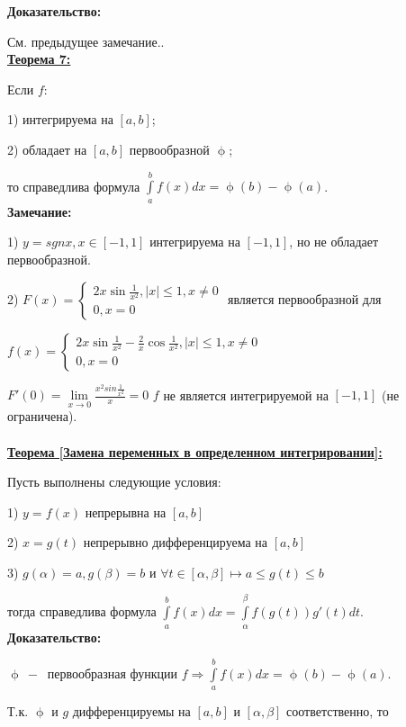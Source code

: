 \documentclass[a4paper,12pt]{article} %
\begin{document}
\textbf{Доказательство:}

См. предыдущее замечание..\\

\underline{\textbf{Теорема 7:}}

Если $f$:

1) интегрируема на $[a,b]$;

2) обладает на $[a,b]$ первообразной $\upphi $;

то справедлива формула $\int\limits_a^{b} f(x)dx = \upphi(b)-  \upphi(a) $.\\

\textbf{Замечание:}

1) $y = sgn x, x \in [-1,1]$ интегрируема на $[-1,1]$, но не обладает первообразной.

2) $F(x)= \begin {cases} 2x \sin \frac{1}{x^2}, |x|\leq 1, x \neq 0\\ 0, x = 0
\end{cases}$ является первообразной для

$f(x) = \begin{cases} 2x \sin\frac{1}{x^2} - \frac{2}{x} \cos\frac{1}{x^2}, |x|\leq 1, x \neq 0\\ 0, x =0
\end{cases}$

$F'(0) =  \lim\limits_{x\rightarrow 0}\frac{x^2 sin\frac{1}{x^2}}{x} = 0$ $f$ не является интегрируемой на $[-1,1]$  (не ограничена).\\\\

\underline{\textbf{Теорема [Замена переменных в определенном интегрировании]:}}

Пусть выполнены следующие условия:

1) $y = f(x)$ непрерывна на $[a,b]$

2) $x = g(t)$ непрерывно дифференцируема на $[a,b]$

3) $g(\alpha) = a, g(\beta) = b$ и $\forall t \in [\alpha, \beta] \longmapsto a \leq g(t)\leq b $

тогда справедлива формула $\int\limits_a^b f(x) dx = \int \limits_\alpha^\beta f(g(t))g'(t) dt$.\\

\textbf{Доказательство:}

$\upphi ~-~$ первообразная функции $f\Rightarrow \int\limits_a^b f(x)dx = \upphi(b)- \upphi(a)$.

Т.к. $\upphi$ и $g$ дифференцируемы на $[a,b]$ и $[\alpha, \beta]$ соответственно, то
\end{document}
